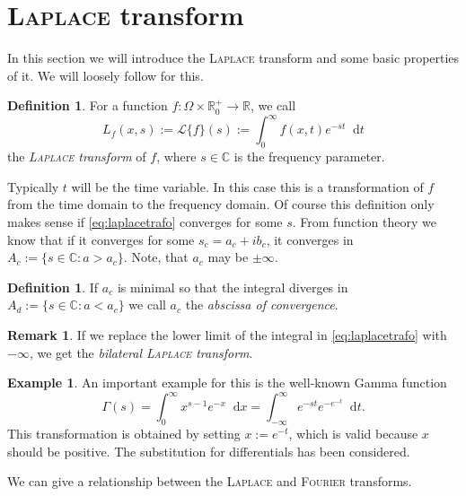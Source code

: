 \documentclass[12pt,a4paper,twoside, open=right]{scrreprt}
\theoremstyle{definition}
\newtheorem{rem}[auf]{Remark}
\newtheorem{defn}[auf]{Definition}
\newtheorem{bsp}[auf]{Example}
\theoremstyle{plain}
\newcommand{\rr}{\mathbb{R}}
\newcommand{\cc}{\mathbb{C}}
\newcommand{\D}{\mathop{}\!\mathrm{d}}
\begin{document}
\section{\textsc{Laplace} transform}
\label{sec:laplacetransform}
In this section we will introduce the \textsc{Laplace} transform and some basic properties of it. We will loosely follow \cite{Widder1945} for this.
\begin{defn}
    For a function $f\colon\Omega\times\rr^+_0\to\rr$, we call
    \begin{equation}
        L_f(x,s):=\mathcal{L}\{f\}(s):=\int_0^\infty f(x,t)e^{-st}\D t\label{eq:laplacetrafo}
    \end{equation}
    the \emph{\textsc{Laplace} transform} of $f$, where $s\in\cc$ is the frequency parameter. 
\end{defn}
Typically $t$ will be the time variable. In this case this is a transformation of $f$ from the time domain to the frequency domain. Of course this definition only makes sense if \eqref{eq:laplacetrafo} converges for some $s$. From function theory we know that if it converges for some $s_c=a_c+ib_c$, it converges in $A_c:=\{s\in\cc\colon a>a_c\}$. Note, that $a_c$ may be $\pm\infty$.
\begin{defn}
    If $a_c$ is minimal so that the integral diverges in $A_d:=\{s\in\cc\colon a<a_c\}$ we call $a_c$ the \emph{abscissa of convergence}. 
\end{defn}
\begin{rem}
    If we replace the lower limit of the integral in \eqref{eq:laplacetrafo} with $-\infty$, we get the \emph{bilateral \textsc{Laplace} transform}.
\end{rem}
\begin{bsp}
    An important example for this is the well-known Gamma function
    \begin{equation}
        \Gamma(s)=\int_0^\infty x^{s-1}e^{-x}\D x=\int_{-\infty}^\infty e^{-st}e^{-e^{-t}}\D t.
    \end{equation}
    This transformation is obtained by setting $x:=e^{-t}$, which is valid because $x$ should be positive. The substitution for differentials has been considered. 
\end{bsp}
We can give a relationship between the \textsc{Laplace} and \textsc{Fourier} transforms.
\end{document}
